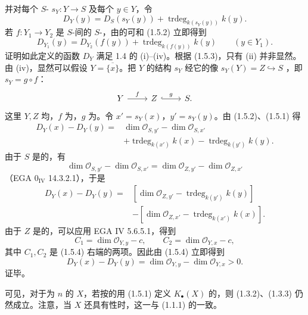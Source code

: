 并对每个 $S$- $s_Y:Y\longrightarrow S$ 及每个 $y\in Y$，令
\[D_Y(y)=D_S(s_Y(y))+\operatorname{trdeg}_{k(s_Y(y))}k(y).\tag{1.5.2}\]
若 $f:Y_1\longrightarrow Y_2$ 是 $S$-间的 $S$-，由的可和 (1.5.2) 立即得到
\[D_{Y_1}(y)=D_{Y_2}(f(y))+\operatorname{trdeg}_{k(f(y))}k(y)\qquad(y\in Y_1).\tag{1.5.3}\]
证明如此定义的函数 $D_Y$ 满足 1.4 的 (i)--(iv)。根据 (1.5.3)，只有 (ii) 并非显然。由 (iv)，显然可以假设 $Y=\overline{\{x\}}$。把 $Y$ 的结构 $s_Y$ 经它的像 $s_Y(Y)=Z\hookrightarrow S$ ，即 $s_Y=g\circ f$：
\[\begin{tikzcd}Y\arrow[r,"f"]&Z\arrow[r,hook,"g"]&S.\end{tikzcd}\]
这里 $Y,Z$ 均，$f$ 为，$g$ 为。令 $x'=s_Y(x)$，$y'=s_Y(y)$。由 (1.5.2)、(1.5.1) 得
\[\begin{aligned}D_Y(x)-D_Y(y)={}&\dim\mathcal O_{S,y'}-\dim\mathcal O_{S,x'}\\&+\operatorname{trdeg}_{k(x')}k(x)-\operatorname{trdeg}_{k(y')}k(y).
\end{aligned}\]
由于 $S$ 是的，有
\[\dim\mathcal O_{S,y'}-\dim\mathcal O_{S,x'}=\dim\mathcal O_{Z,y'}-\dim\mathcal O_{Z,x'}\]
（EGA $0_{\mathrm{IV}}$ 14.3.2.1），于是
\[\begin{aligned}D_Y(x)-D_Y(y)={}&[\dim\mathcal O_{Z,y'}-\operatorname{trdeg}_{k(y')}k(y)]\\&-[\dim\mathcal O_{Z,x'}-\operatorname{trdeg}_{k(x')}k(x)].\end{aligned}\tag{1.5.4}\]
由于 $Z$ 是的，可以应用 EGA IV 5.6.5.1，得到
\[C_1=\dim\mathcal O_{Y,y}-c,\qquad C_2=\dim\mathcal O_{Y,x}-c,\]
其中 $C_1,C_2$ 是 (1.5.4) 右端的两项。因此由 (1.5.4) 立即得到
\[D_Y(x)-D_Y(y)=\dim\mathcal O_{Y,y}-\dim\mathcal O_{Y,x}>0.\]
证毕。

可见，对于为 $n$ 的   $X$，若按的用 (1.5.1) 定义 $K_\bullet(X)$ 的，则 (1.3.2)、(1.3.3) 仍然成立。注意，当 $X$ 还具有性时，这一与 (1.1.1) 的一致。

